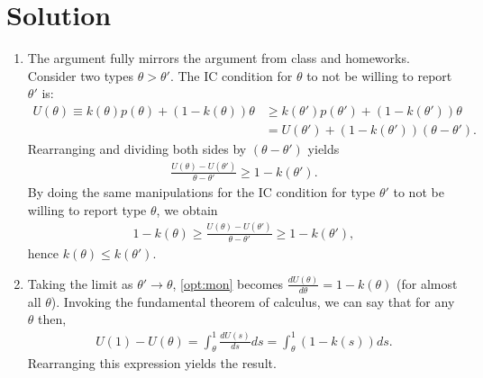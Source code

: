 \documentclass[a4paper]{article}
\begin{document}
\section*{Solution}
\begin{enumerate}
	\item The argument fully mirrors the argument from class and homeworks. Consider two types $\theta > \theta'$. The IC condition for $\theta$ to not be willing to report $\theta'$ is:
	\begin{align*}
		U(\theta) \equiv k(\theta) p(\theta) + (1-k(\theta)) \theta &\geq k(\theta') p(\theta') + (1-k(\theta')) \theta
		\\
		&= U(\theta') + (1-k(\theta')) (\theta-\theta').
	\end{align*}
	Rearranging and dividing both sides by $(\theta-\theta')$ yields
	\begin{align*}
		\frac{U(\theta)-U(\theta')}{\theta-\theta'} \geq 1-k(\theta').
	\end{align*}
	By doing the same manipulations for the IC condition for type $\theta'$ to not be willing to report type $\theta$, we obtain
	\begin{align}
		\label{opt:mon}
		1-k(\theta) \geq \frac{U(\theta)-U(\theta')}{\theta-\theta'} \geq 1-k(\theta'),
	\end{align}
	hence $k(\theta) \leq k(\theta')$.
	
	\item Taking the limit as $\theta' \to \theta$, \eqref{opt:mon} becomes $\frac{dU(\theta)}{d\theta} = 1-k(\theta)$ (for almost all $\theta$). Invoking the fundamental theorem of calculus, we can say that for any $\theta$ then,
	\begin{align}
		\label{opt:ERP}
		U(1) - U(\theta) = \int_{\theta}^{1} \frac{dU(s)}{ds} ds = \int_{\theta}^{1} (1-k(s)) ds.
	\end{align}
	Rearranging this expression yields the result.
	

\end{enumerate}
\end{document}
